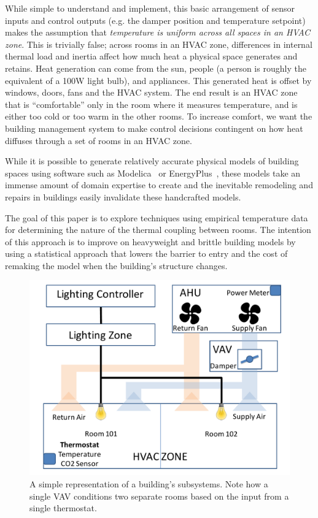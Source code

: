 While simple to understand and implement, this basic arrangement of sensor inputs and control outputs (e.g. the damper position and temperature setpoint) makes the assumption that \emph{temperature is uniform across all spaces in an HVAC zone}.
This is trivially false; across rooms in an HVAC zone, differences in internal thermal load and inertia affect how much heat a physical space generates and retains.
Heat generation can come from the sun, people (a person is roughly the equivalent of a 100W light bulb), and appliances.
This generated heat is offset by windows, doors, fans and the HVAC system.
The end result is an HVAC zone that is ``comfortable'' only in the room where it measures temperature, and is either too cold or too warm in the other rooms.
To increase comfort, we want the building management system to make control decisions contingent on how heat diffuses through a set of rooms in an HVAC zone.

While it is possible to generate relatively accurate physical models of building spaces using software such as Modelica~\cite{fritzson2010principles} or EnergyPlus~\cite{energyplus}, these models take an immense amount of domain expertise to create and the inevitable remodeling and repairs in buildings easily invalidate these handcrafted models.

The goal of this paper is to explore techniques using empirical temperature data for determining the nature of the thermal coupling between rooms.
The intention of this approach is to improve on heavyweight and brittle building models by using a statistical approach that lowers the barrier to entry and the cost of remaking the model when the building's structure changes.


\begin{figure}
\centering
\includegraphics[width=.5\linewidth]{figs/example_building}
\caption{A simple representation of a building's subsystems. Note how a single VAV conditions two separate rooms based on the input from a single thermostat.}
\label{fig:example_building}
\end{figure}

